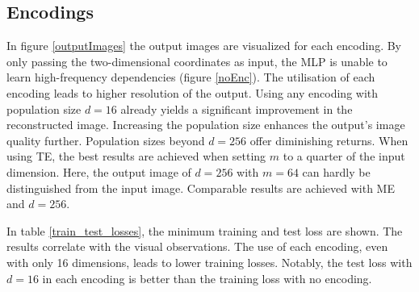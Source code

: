 \subsection{Encodings}
In figure \ref{outputImages} the output images are visualized for each encoding. By only passing the two-dimensional coordinates as input, the MLP is unable to learn high-frequency dependencies (figure \ref{noEnc}). 
The utilisation of each encoding leads to higher resolution of the output. Using any encoding with population size $d = 16$ already yields a significant improvement in the reconstructed image. Increasing the population size enhances the output's image quality further. Population sizes beyond $d = 256$ offer diminishing returns. When using TE, the best results are achieved when setting $m$ to a quarter of the input dimension. Here, the output image of $d = 256$ with $m = 64$ can hardly be distinguished from the input image. Comparable results are achieved with ME and $d = 256$. 

In table \ref{train_test_losses}, the minimum training and test loss are shown. The results correlate with the visual observations. The use of each encoding, even with only 16 dimensions, leads to lower training losses. Notably, the test loss with $d=16$ in each encoding is better than the training loss with no encoding.



